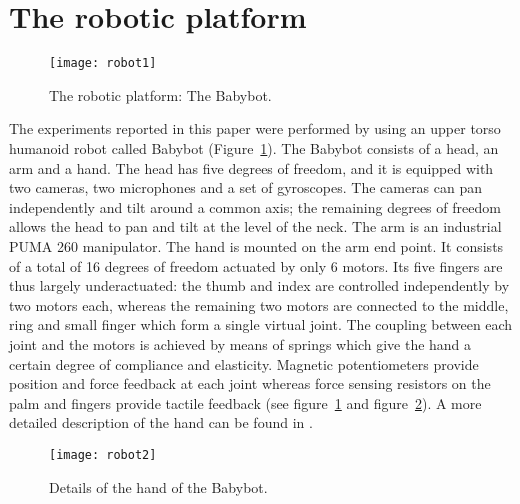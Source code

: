 \section{The robotic platform}
\label{sect:robot}

\begin{figure}
\centering
\texttt{[image: robot1]}
\caption{The robotic platform: The Babybot.}
\label{fig-platform}
\end{figure}

The experiments reported in this paper were performed by using an upper torso humanoid robot called Babybot (Figure~\ref{fig-platform}). The Babybot consists of a head, an arm and a hand. The head has five degrees of freedom, and it is equipped with two cameras, two microphones and a set of gyroscopes. The cameras can pan independently and tilt around a common axis; the remaining degrees of freedom allows the head to pan and tilt at the level of the neck. The arm is an industrial PUMA 260 manipulator. The hand is mounted on the arm end point. It consists of a total of 16 degrees of freedom actuated by only 6 motors. Its five fingers are thus largely underactuated: the thumb and index are controlled independently by two motors each, whereas the remaining two motors are connected to the middle, ring and small finger which form a single virtual joint. The coupling between each joint and the motors is achieved by means of springs which give the hand a certain degree of compliance and elasticity. Magnetic potentiometers provide position and force feedback at each joint whereas force sensing resistors on the palm and fingers provide tactile feedback (see figure~\ref{fig-platform} and figure~\ref{fig-platform2}). A more detailed description of the hand can be found in \cite{natale04thesis}.

\begin{figure}
\centering
\texttt{[image: robot2]}
\caption{Details of the hand of the Babybot.}
\label{fig-platform2}
\end{figure}

